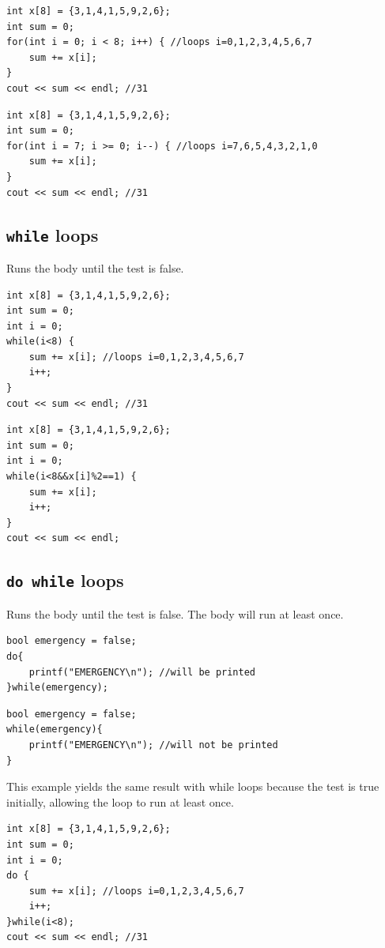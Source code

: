 \begin{lstlisting}
int x[8] = {3,1,4,1,5,9,2,6};
int sum = 0;
for(int i = 0; i < 8; i++) { //loops i=0,1,2,3,4,5,6,7
    sum += x[i];
}
cout << sum << endl; //31
\end{lstlisting}

\begin{lstlisting}
int x[8] = {3,1,4,1,5,9,2,6};
int sum = 0;
for(int i = 7; i >= 0; i--) { //loops i=7,6,5,4,3,2,1,0
    sum += x[i];
}
cout << sum << endl; //31
\end{lstlisting}

\subsection{\texttt{while} loops}
Runs the body until the test is false.
\begin{lstlisting}
int x[8] = {3,1,4,1,5,9,2,6};
int sum = 0;
int i = 0;
while(i<8) { 
    sum += x[i]; //loops i=0,1,2,3,4,5,6,7
    i++;
}
cout << sum << endl; //31
\end{lstlisting}

\begin{lstlisting}
int x[8] = {3,1,4,1,5,9,2,6};
int sum = 0;
int i = 0;
while(i<8&&x[i]%2==1) { 
    sum += x[i];
    i++;
}
cout << sum << endl;
\end{lstlisting}


\subsection{\texttt{do while} loops}
Runs the body until the test is false. The body will run at least once.

\begin{lstlisting}
bool emergency = false;
do{
    printf("EMERGENCY\n"); //will be printed
}while(emergency);
\end{lstlisting}

\begin{lstlisting}
bool emergency = false;
while(emergency){
    printf("EMERGENCY\n"); //will not be printed
}
\end{lstlisting}

This example yields the same result with while loops because the test is true initially, allowing the loop to run at least once.

\begin{lstlisting}
int x[8] = {3,1,4,1,5,9,2,6};
int sum = 0;
int i = 0;
do { 
    sum += x[i]; //loops i=0,1,2,3,4,5,6,7
    i++;
}while(i<8);
cout << sum << endl; //31
\end{lstlisting}

